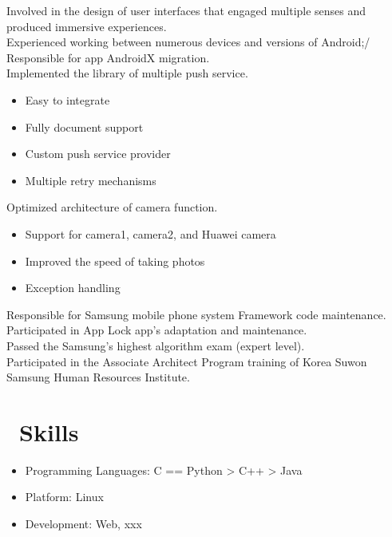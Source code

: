 \documentclass{resume}
\begin{document}
Involved in the design of user interfaces that engaged multiple senses and produced immersive experiences.\\
Experienced working between numerous devices and versions of Android;/ Responsible for app AndroidX migration.\\
Implemented the library of multiple push service.
\begin{itemize}
  \item Easy to integrate
  \item Fully document support
  \item Custom push service provider
  \item Multiple retry mechanisms
\end{itemize}
Optimized architecture of camera function.
\begin{itemize}
  \item Support for camera1, camera2, and Huawei camera
  \item Improved the speed of taking photos
  \item Exception handling
\end{itemize}

Responsible for Samsung mobile phone system Framework code maintenance.\\
Participated in App Lock app's adaptation and maintenance.\\
Passed the Samsung's highest algorithm exam (expert level).\\
Participated in the Associate Architect Program training of Korea Suwon Samsung Human Resources Institute.\\


\section{\faCogs\ Skills}
\begin{itemize}[parsep=0.5ex]
  \item Programming Languages: C == Python > C++ > Java
  \item Platform: Linux
  \item Development: Web, xxx
\end{itemize}
\end{document}

